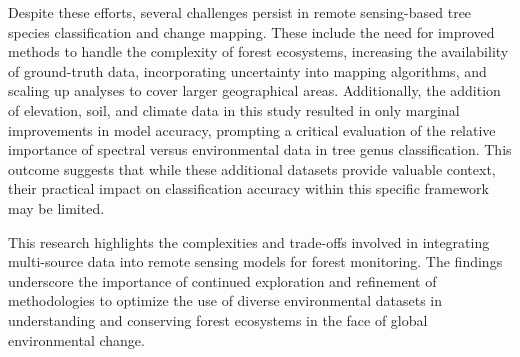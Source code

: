 Despite these efforts, several challenges persist in remote sensing-based tree species classification and change mapping. These include the need for improved methods to handle the complexity of forest ecosystems, increasing the availability of ground-truth data, incorporating uncertainty into mapping algorithms, and scaling up analyses to cover larger geographical areas. Additionally, the addition of elevation, soil, and climate data in this study resulted in only marginal improvements in model accuracy, prompting a critical evaluation of the relative importance of spectral versus environmental data in tree genus classification. This outcome suggests that while these additional datasets provide valuable context, their practical impact on classification accuracy within this specific framework may be limited.

This research highlights the complexities and trade-offs involved in integrating multi-source data into remote sensing models for forest monitoring. The findings underscore the importance of continued exploration and refinement of methodologies to optimize the use of diverse environmental datasets in understanding and conserving forest ecosystems in the face of global environmental change.
